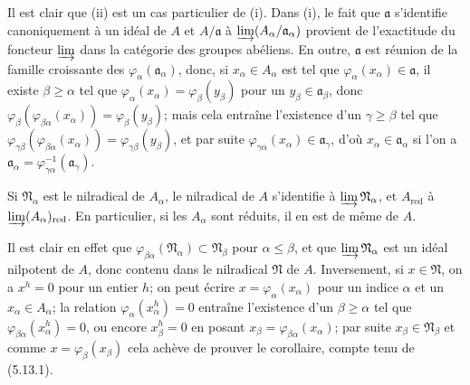 Il est clair que (ii) est un cas particulier de (i). Dans (i), le fait que
$\mathfrak a$ s'identifie canoniquement à un idéal de $A$ et $A/\mathfrak a$ à
$\varinjlim(A_\alpha/\mathfrak a_\alpha)$ provient de l'exactitude du foncteur
$\varinjlim$ dans la catégorie des groupes abéliens. En outre, $\mathfrak a$
est réunion de la famille croissante des $\varphi_\alpha(\mathfrak a_\alpha)$,
donc, si $x_\alpha\in A_\alpha$ est tel que
$\varphi_\alpha(x_\alpha)\in\mathfrak a$, il existe $\beta\geq\alpha$ tel que
$\varphi_\alpha(x_\alpha)=\varphi_\beta(y_\beta)$ pour un
$y_\beta\in\mathfrak a_\beta$, donc
$\varphi_\beta(\varphi_{\beta\alpha}(x_\alpha))=\varphi_\beta(y_\beta)$; mais
cela entraîne l'existence d'un $\gamma\geq\beta$ tel que
$\varphi_{\gamma\beta}(\varphi_{\beta\alpha}(x_\alpha))=\varphi_{\gamma\beta}(y_\beta)$,
et par suite $\varphi_{\gamma\alpha}(x_\alpha)\in\mathfrak a_\gamma$, d'où
$x_\alpha\in\mathfrak a_\alpha$ si l'on a
$\mathfrak a_\alpha=\varphi_{\gamma\alpha}^{-1}(\mathfrak a_\gamma)$.

\begin{corollary}[5.13.2]
\label{IV.2.s5.13.2-fr}
Si $\mathfrak N_\alpha$ est le nilradical de $A_\alpha$, le nilradical de $A$
s'identifie à $\varinjlim\mathfrak N_\alpha$, et $A_{\mathrm{red}}$ à
$\varinjlim(A_\alpha)_{\mathrm{red}}$. En particulier, si les $A_\alpha$ sont
réduits, il en est de même de $A$.
\end{corollary}


Il est clair en effet que
$\varphi_{\beta\alpha}(\mathfrak N_\alpha)\subset\mathfrak N_\beta$ pour
$\alpha\leq\beta$, et que $\varinjlim\mathfrak N_\alpha$ est un idéal
nilpotent de $A$, donc contenu dans le nilradical $\mathfrak N$ de $A$.
Inversement, si $x\in\mathfrak N$, on a $x^h=0$ pour un entier $h$; on peut
écrire $x=\varphi_\alpha(x_\alpha)$ pour un indice $\alpha$ et un
$x_\alpha\in A_\alpha$; la relation $\varphi_\alpha(x_\alpha^h)=0$ entraîne
l'existence d'un $\beta\geq\alpha$ tel que
$\varphi_{\beta\alpha}(x_\alpha^h)=0$, ou encore $x_\beta^h=0$ en posant
$x_\beta=\varphi_{\beta\alpha}(x_\alpha)$; par suite
$x_\beta\in\mathfrak N_\beta$ et comme $x=\varphi_\beta(x_\beta)$ cela achève
de prouver le corollaire, compte tenu de (5.13.1).

